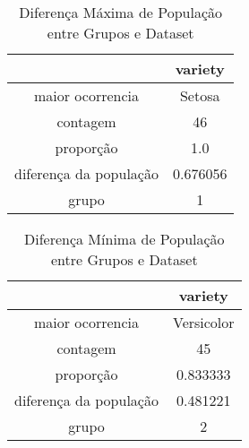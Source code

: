 \documentclass{article}%
\begin{document}
\begin{table}[htbp]%
\caption{Diferença Máxima de População entre Grupos e Dataset}%
\centering%
\begin{tabular}{cc}
\toprule
{} &   variety \\
\midrule
maior ocorrencia       &    Setosa \\
contagem               &        46 \\
proporção              &       1.0 \\
diferença da população &  0.676056 \\
grupo                  &         1 \\
\bottomrule
\end{tabular}
%
\label{tab:notavelmax}%
\end{table}

%


\begin{table}[htbp]%
\caption{Diferença Mínima de População entre Grupos e Dataset}%
\centering%
\begin{tabular}{cc}
\toprule
{} &     variety \\
\midrule
maior ocorrencia       &  Versicolor \\
contagem               &          45 \\
proporção              &    0.833333 \\
diferença da população &    0.481221 \\
grupo                  &           2 \\
\bottomrule
\end{tabular}
%
\label{tab:notavelmin}%
\end{table}

%
\FloatBarrier%
\end{document}
